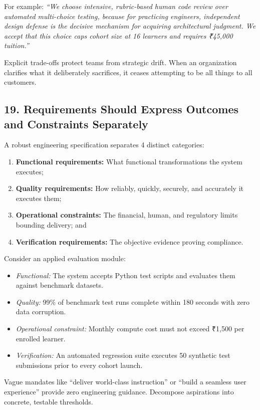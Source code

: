 For example: \emph{``We choose intensive, rubric-based human code review over automated multi-choice testing, because for practicing engineers, independent design defense is the decisive mechanism for acquiring architectural judgment. We accept that this choice caps cohort size at 16 learners and requires ₹45,000 tuition.''}

Explicit trade-offs protect teams from strategic drift. When an organization clarifies what it deliberately sacrifices, it ceases attempting to be all things to all customers.

\subsection*{19. Requirements Should Express Outcomes and Constraints Separately}

A robust engineering specification separates 4 distinct categories:
\begin{enumerate}
    \item \textbf{Functional requirements:} What functional transformations the system executes;
    \item \textbf{Quality requirements:} How reliably, quickly, securely, and accurately it executes them;
    \item \textbf{Operational constraints:} The financial, human, and regulatory limits bounding delivery; and
    \item \textbf{Verification requirements:} The objective evidence proving compliance.
\end{enumerate}

Consider an applied evaluation module:
\begin{itemize}
    \item \emph{Functional:} The system accepts Python test scripts and evaluates them against benchmark datasets.
    \item \emph{Quality:} 99\% of benchmark test runs complete within 180 seconds with zero data corruption.
    \item \emph{Operational constraint:} Monthly compute cost must not exceed ₹1,500 per enrolled learner.
    \item \emph{Verification:} An automated regression suite executes 50 synthetic test submissions prior to every cohort launch.
\end{itemize}

Vague mandates like ``deliver world-class instruction'' or ``build a seamless user experience'' provide zero engineering guidance. Decompose aspirations into concrete, testable thresholds.

